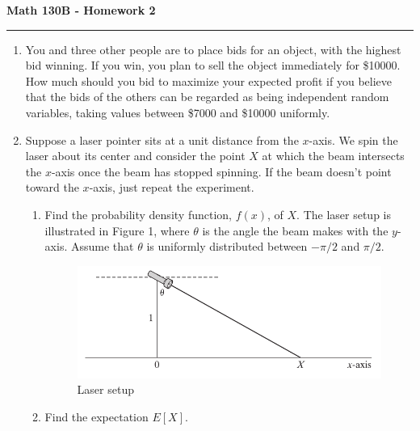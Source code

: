 \documentclass[11pt,letterpaper]{article}
\begin{document}
\begin{center}
{\bf \Large Math 130B - Homework 2}
\vspace{0.2cm}
\hrule
\end{center}



\begin{enumerate}

    \item You and three other people are to place bids for an object, with the highest bid winning.
    If you win, you plan to sell the object immediately for \$10000.
    How much should you bid to maximize your expected profit if you believe that the bids of the others can be regarded as being independent random variables, taking values between \$7000 and \$10000 uniformly.

    \item Suppose a laser pointer sits at a unit distance from the $x$-axis.
    We spin the laser about its center and consider the point $X$ at which the beam intersects the $x$-axis once the beam has stopped spinning.
    If the beam doesn't point toward the $x$-axis, just repeat the experiment.

    \begin{enumerate}
        \item Find the probability density function, $f(x)$, of $X$.
        The laser setup is illustrated in Figure 1,
        where $\theta$ is the angle the beam makes with the $y$-axis.
        Assume that $\theta$ is uniformly distributed between $-\pi/2$ and $\pi/2$.
        \begin{figure}[h]
            \centering
            \includegraphics[scale=.6]{beam.PNG}
            \caption{Laser setup}
        \end{figure}

        \item Find the expectation $E[X]$.
    \end{enumerate}


\end{enumerate}
\end{document}
